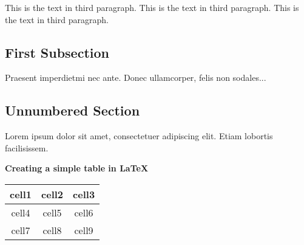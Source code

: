 \documentclass[12pt, letterpaper]{article}
\begin{document}
\noindent	%
This is the text in third paragraph. This is the text in third 
paragraph. This is the text in third paragraph.

\subsection{First Subsection}
Praesent imperdietmi nec ante. Donec ullamcorper, felis non sodales...

\subsection*{Unnumbered Section}
Lorem ipsum dolor sit amet, consectetuer adipiscing elit. Etiam lobortis facilisissem.

\begin{comment}
The basic levels of depth are listed below:
-1 \part{part}
0 \chapter{chapter}
1 \section{section}
2 \subsection{subsection}
3 \subsubsection{subsubsection}
4 \paragraph{paragraph}
5 \subparagraph{subparagraph}
\end{comment}

\textbf{Creating a simple table in LaTeX}

\begin{table}
\begin{center}
\begin{tabular}{| c | c | c |}		%
	\hline	%
	cell1 & cell2 & cell3 \\	%
	\hline
	cell4 & cell5 & cell6 \\	%
	\hline\hline
	cell7 & cell8 & cell9 \\
	\hline
\end{tabular}
\end{center}
\end{table}
\end{document}
